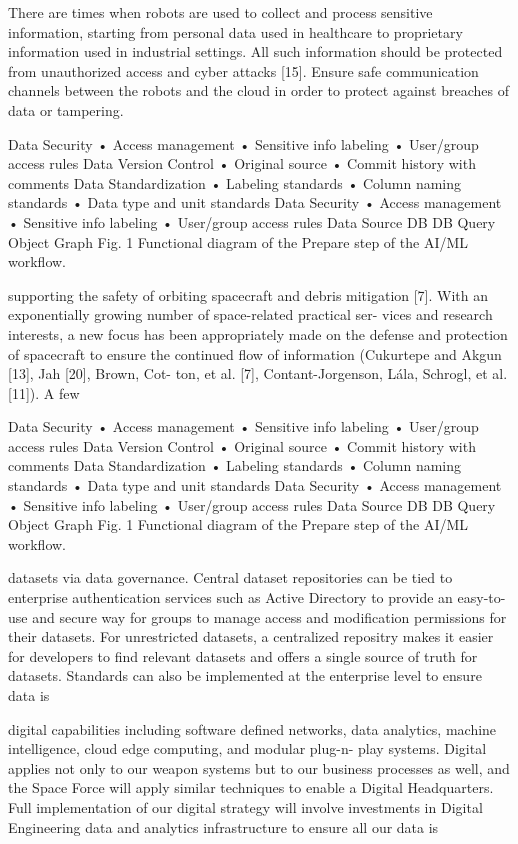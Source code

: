\documentclass[a4paper,12pt]{article}
\begin{document}
There are times when robots are used to collect and process sensitive information, starting from personal data used in healthcare to 
proprietary information used in industrial settings. All such information should be protected from unauthorized access and cyber attacks 
[15]. Ensure safe communication channels between the robots and the cloud in order to protect against breaches of data or tampering.

Data Security
• Access management
• Sensitive info labeling
• User/group access rules
Data Version Control
• Original source
• Commit history with 
comments
Data Standardization
• Labeling standards
• Column naming standards
• Data type and unit standards
Data Security
• Access management
• Sensitive info labeling
• User/group access rules
Data 
Source
DB
DB
Query
Object
Graph
Fig. 1
Functional diagram of the Prepare step of the AI/ML workﬂow.

supporting the safety of orbiting spacecraft and debris mitigation [7].
With an exponentially growing number of space-related practical ser-
vices and research interests, a new focus has been appropriately made
on the defense and protection of spacecraft to ensure the continued
ﬂow of information (Cukurtepe and Akgun [13], Jah [20], Brown, Cot-
ton, et al. [7], Contant-Jorgenson, Lála, Schrogl, et al. [11]). A few

Data Security
• Access management
• Sensitive info labeling
• User/group access rules
Data Version Control
• Original source
• Commit history with 
comments
Data Standardization
• Labeling standards
• Column naming standards
• Data type and unit standards
Data Security
• Access management
• Sensitive info labeling
• User/group access rules
Data 
Source
DB
DB
Query
Object
Graph
Fig. 1
Functional diagram of the Prepare step of the AI/ML workﬂow.

datasets via data governance. Central dataset repositories can be tied to enterprise authentication services such as Active
Directory to provide an easy-to-use and secure way for groups to manage access and modiﬁcation permissions for their
datasets. For unrestricted datasets, a centralized repositry makes it easier for developers to ﬁnd relevant datasets and
oﬀers a single source of truth for datasets. Standards can also be implemented at the enterprise level to ensure data is

digital 
capabilities 
including 
software defined networks, data analytics, machine 
intelligence, cloud edge computing, and modular plug-n-
play systems.  Digital applies not only to our weapon 
systems but to our business processes as well, and the 
Space Force will apply similar techniques to enable a 
Digital Headquarters. Full implementation of our digital 
strategy will involve investments in Digital Engineering 
data and analytics infrastructure to ensure all our data is
\end{document}
